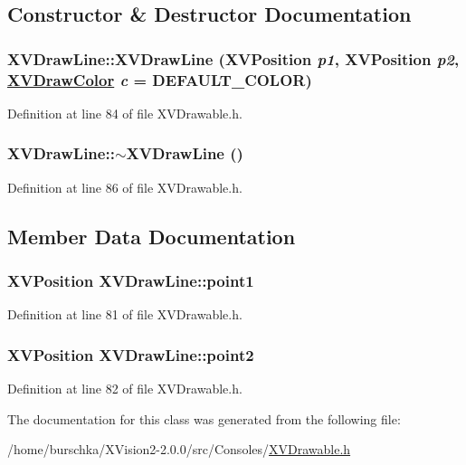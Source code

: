 \subsection{Constructor \& Destructor Documentation}
\label{XVDrawLine_a0}
\hypertarget{class_XVDrawLine_a0}{
\subsubsection[XVDrawLine]{\setlength{\rightskip}{0pt plus 5cm}XVDraw\-Line::XVDraw\-Line (XVPosition {\em p1}, XVPosition {\em p2}, \hyperlink{class_XVDrawColor}{XVDraw\-Color} {\em c} = DEFAULT\_\-COLOR)}}




Definition at line 84 of file XVDrawable.h.\label{XVDrawLine_a1}
\hypertarget{class_XVDrawLine_a1}{
\subsubsection[~XVDrawLine]{\setlength{\rightskip}{0pt plus 5cm}XVDraw\-Line::$\sim$XVDraw\-Line ()}}




Definition at line 86 of file XVDrawable.h.

\subsection{Member Data Documentation}
\label{XVDrawLine_m0}
\hypertarget{class_XVDrawLine_m0}{
\subsubsection[point1]{\setlength{\rightskip}{0pt plus 5cm}XVPosition XVDraw\-Line::point1}}




Definition at line 81 of file XVDrawable.h.\label{XVDrawLine_m1}
\hypertarget{class_XVDrawLine_m1}{
\subsubsection[point2]{\setlength{\rightskip}{0pt plus 5cm}XVPosition XVDraw\-Line::point2}}




Definition at line 82 of file XVDrawable.h.

The documentation for this class was generated from the following file:\begin{CompactItemize}
\item 
/home/burschka/XVision2-2.0.0/src/Consoles/\hyperlink{XVDrawable.h-source}{XVDrawable.h}\end{CompactItemize}

